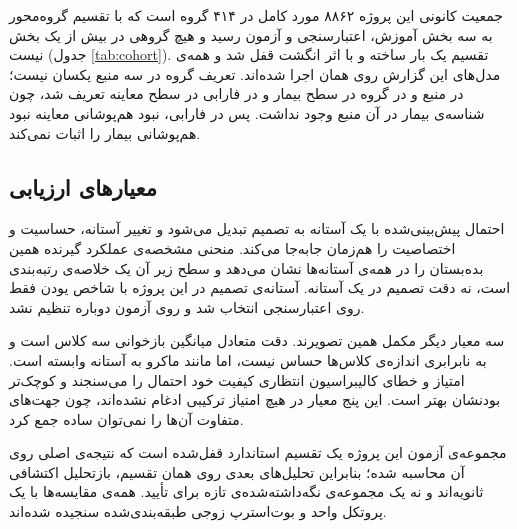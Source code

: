 جمعیت کانونی این پروژه ۸۸۶۲ مورد کامل در ۴۱۴ گروه است که با تقسیم گروه‌محور به سه بخش آموزش، اعتبارسنجی و آزمون رسید و هیچ گروهی در بیش از یک بخش نیست (جدول \autoref{tab:cohort}). تقسیم یک بار ساخته و با اثر انگشت قفل شد و همه‌ی مدل‌های این گزارش روی همان اجرا شده‌اند. تعریف گروه در سه منبع یکسان نیست؛ در منبع  و در  گروه در سطح بیمار و در فارابی در سطح معاینه تعریف شد، چون شناسه‌ی بیمار در آن منبع وجود نداشت. پس در فارابی، نبود هم‌پوشانی معاینه نبود هم‌پوشانی بیمار را اثبات نمی‌کند.

\subsection{معیارهای ارزیابی}

احتمال پیش‌بینی‌شده با یک آستانه به تصمیم تبدیل می‌شود و تغییر آستانه، حساسیت و اختصاصیت را هم‌زمان جابه‌جا می‌کند. منحنی مشخصه‌ی عملکرد گیرنده همین بده‌بستان را در همه‌ی آستانه‌ها نشان می‌دهد و سطح زیر آن یک خلاصه‌ی رتبه‌بندی است، نه دقت تصمیم در یک آستانه. آستانه‌ی تصمیم در این پروژه با شاخص یودن فقط روی اعتبارسنجی انتخاب شد و روی آزمون دوباره تنظیم نشد.

سه معیار دیگر مکمل همین تصویرند. دقت متعادل میانگین بازخوانی سه کلاس است و به نابرابری اندازه‌ی کلاس‌ها حساس نیست، اما مانند  ماکرو به آستانه وابسته است. امتیاز  و خطای کالیبراسیون انتظاری  کیفیت خود احتمال را می‌سنجند و کوچک‌تر بودنشان بهتر است. این پنج معیار در هیچ امتیاز ترکیبی ادغام نشده‌اند، چون جهت‌های متفاوت آن‌ها را نمی‌توان ساده جمع کرد.

مجموعه‌ی آزمون این پروژه یک تقسیم استاندارد قفل‌شده است که نتیجه‌ی اصلی روی آن محاسبه شده؛ بنابراین تحلیل‌های بعدی روی همان تقسیم، بازتحلیل اکتشافی ثانویه‌اند و نه یک مجموعه‌ی نگه‌داشته‌شده‌ی تازه برای تأیید. همه‌ی مقایسه‌ها با یک پروتکل واحد و بوت‌استرپ زوجی طبقه‌بندی‌شده سنجیده شده‌اند.

